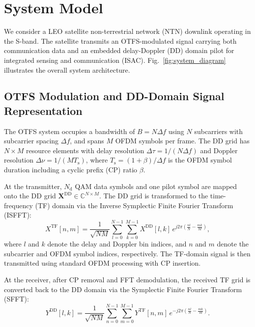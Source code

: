 
\section{System Model}

We consider a LEO satellite non-terrestrial network (NTN) downlink operating in the S-band. The satellite transmits an OTFS-modulated signal carrying both communication data and an embedded delay-Doppler (DD) domain pilot for integrated sensing and communication (ISAC). Fig.~\ref{fig:system_diagram} illustrates the overall system architecture.

\subsection{OTFS Modulation and DD-Domain Signal Representation}

The OTFS system occupies a bandwidth of $B = N \Delta f$ using $N$ subcarriers with subcarrier spacing $\Delta f$, and spans $M$ OFDM symbols per frame. The DD grid has $N \times M$ resource elements with delay resolution $\Delta\tau = 1/(N\Delta f)$ and Doppler resolution $\Delta\nu = 1/(M T_{\mathrm{s}})$, where $T_{\mathrm{s}} = (1+\beta)/\Delta f$ is the OFDM symbol duration including a cyclic prefix (CP) ratio $\beta$.

At the transmitter, $N_{\mathrm{d}}$ QAM data symbols and one pilot symbol are mapped onto the DD grid $\mathbf{X}^{\mathrm{DD}} \in \mathbb{C}^{N \times M}$. The DD grid is transformed to the time-frequency (TF) domain via the Inverse Symplectic Finite Fourier Transform (ISFFT):
\begin{equation}\label{eq:isfft}
  X^{\mathrm{TF}}[n,m] = \frac{1}{\sqrt{NM}} \sum_{l=0}^{N-1} \sum_{k=0}^{M-1} X^{\mathrm{DD}}[l,k]\, e^{j2\pi\left(\frac{nl}{N} - \frac{mk}{M}\right)},
\end{equation}
where $l$ and $k$ denote the delay and Doppler bin indices, and $n$ and $m$ denote the subcarrier and OFDM symbol indices, respectively. The TF-domain signal is then transmitted using standard OFDM processing with CP insertion.

At the receiver, after CP removal and FFT demodulation, the received TF grid is converted back to the DD domain via the Symplectic Finite Fourier Transform (SFFT):
\begin{equation}\label{eq:sfft}
  Y^{\mathrm{DD}}[l,k] = \frac{1}{\sqrt{NM}} \sum_{n=0}^{N-1} \sum_{m=0}^{M-1} Y^{\mathrm{TF}}[n,m]\, e^{-j2\pi\left(\frac{nl}{N} - \frac{mk}{M}\right)}.
\end{equation}

